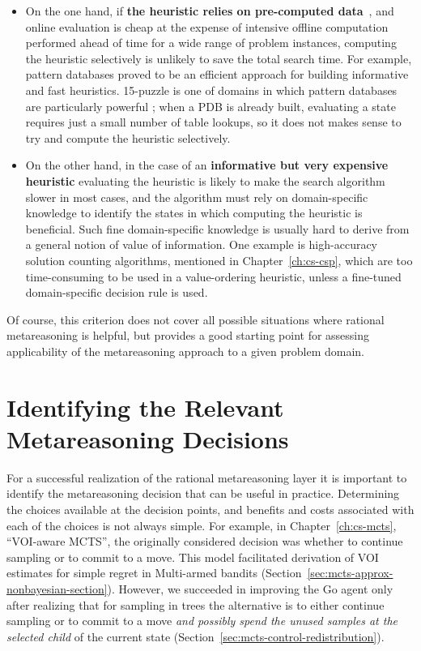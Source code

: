 \begin{itemize}
\item On the one hand, if \textbf{the heuristic relies on pre-computed
  data}~\cite{pattern,Felner.apdb}, and online evaluation is cheap at the expense of intensive
  offline computation performed ahead of time for a wide
  range of problem instances, computing the heuristic selectively is
  unlikely to save the total search time. For example, pattern
  databases \cite{pattern} proved to be an efficient approach for
  building informative and fast heuristics. 15-puzzle is one of
  domains in which pattern databases are particularly powerful
  \cite{Felner.apdb}; when a PDB is already built,  evaluating a state
  requires  just a small number of table lookups, so it does not makes sense to try and
  compute the heuristic selectively.
\item On the other hand, in the case of an \textbf{informative but
  very expensive heuristic} evaluating the heuristic is likely 
  to make the search algorithm slower in most cases, and the
  algorithm must rely on domain-specific knowledge to
  identify the states in which computing the heuristic is beneficial. 
  Such fine domain-specific knowledge is usually hard to derive from
  a general notion of value of information. One example is
  high-accuracy solution counting algorithms, mentioned in
  Chapter~\ref{ch:cs-csp}, which are too time-consuming to be used
  in a value-ordering heuristic, unless a fine-tuned domain-specific
  decision rule is used.
\end{itemize}

Of course, this criterion does not cover all possible situations where
rational metareasoning is helpful, but provides a good starting point
for assessing applicability of the metareasoning approach to a given
problem domain.

\section{Identifying the Relevant Metareasoning Decisions}

For a successful realization of the rational metareasoning layer it is
important to identify the metareasoning decision that can be useful
in practice. Determining the
choices available at the decision points, and benefits and costs
associated with each of the choices is not always simple. For example,
in Chapter~\ref{ch:cs-mcts}, ``VOI-aware MCTS'', the originally
considered decision was whether to continue sampling or to commit to a
move. This model facilitated derivation of VOI estimates for simple
regret in Multi-armed bandits
(Section~\ref{sec:mcts-approx-nonbayesian-section}). However, we
succeeded in improving the Go agent only after realizing that for sampling in trees
the alternative is to either continue sampling or to commit to a move
\emph{and possibly spend the unused samples at the selected child} of
the current state (Section~\ref{sec:mcts-control-redistribution}).

